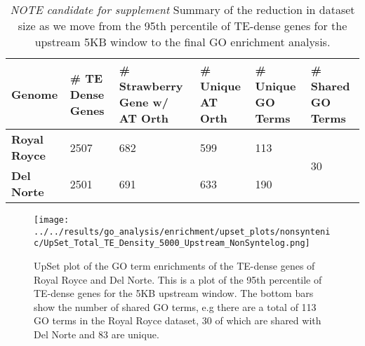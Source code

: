 \documentclass[fleqn,10pt]{olplainarticle}
\begin{document}
\begin{table}[]
\centering
\small
\begin{tabular}{l|l|l|l|l|l}
\toprule
\textbf{Genome} & \textbf{\# TE Dense Genes} & \textbf{\# Strawberry Gene w/ AT Orth} & \textbf{\# Unique AT Orth} & \textbf{\# Unique GO Terms} & \textbf{\# Shared GO Terms} \\
\bottomrule
\textbf{Royal Royce}     & 2507                        & 682                                        & 599                      & 113                   & \multirow{2}{*}{30}          \\
\textbf{Del Norte}       & 2501                        & 691                                        & 633                      & 190                   &                              \\
\bottomrule
\end{tabular}
\caption{\textit{NOTE candidate for supplement} Summary of the reduction in dataset size as we move from the 95th percentile of TE-dense genes for the upstream 5KB window to the final GO enrichment analysis.}
\label{tab:upset_numbers}
\end{table}

\begin{figure}[ht]
\centering
\texttt{[image: ../../results/go\_analysis/enrichment/upset\_plots/nonsyntenic/UpSet\_Total\_TE\_Density\_5000\_Upstream\_NonSyntelog.png]}
	\caption{UpSet plot of the GO term enrichments of the TE-dense genes of Royal Royce and Del Norte. This is a plot of the 95th percentile of TE-dense genes for the 5KB upstream window. The bottom bars show the number of shared GO terms, e.g there are a total of 113 GO terms in the Royal Royce dataset, 30 of which are shared with Del Norte and 83 are unique.}
	\label{fig:go_compare_total_5K}
\end{figure}
\end{document}

